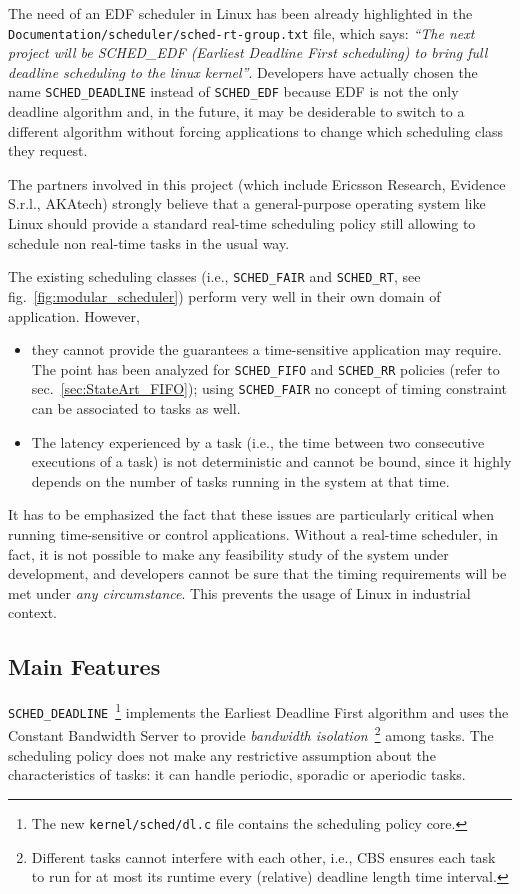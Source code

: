 The need of an EDF scheduler in Linux has been already highlighted in
the \texttt{Documentation/scheduler/sched-rt-group.txt} file, which
says: \emph{``The next project will be SCHED\_EDF (Earliest Deadline
  First scheduling) to bring full deadline scheduling to the linux
  kernel''}. Developers have actually chosen the name
\texttt{SCHED\_DEADLINE} instead of \texttt{SCHED\_EDF} because EDF is
not the only deadline algorithm and, in the future, it may be
desiderable to switch to a different algorithm without forcing
applications to change which scheduling class they request.

The partners involved in this project (which include Ericsson
Research, Evidence S.r.l., AKAtech) strongly believe that a
general-purpose operating system like Linux should provide a standard
real-time scheduling policy still allowing to schedule non real-time
tasks in the usual way.

The existing scheduling classes (i.e., \texttt{SCHED\_FAIR} and
\texttt{SCHED\_RT}, see fig.~\ref{fig:modular_scheduler}) perform very well in
their own domain of application. However,
\begin{itemize}
\item they cannot provide the guarantees a time-sensitive application
  may require. The point has been analyzed for \texttt{SCHED\_FIFO}
  and \texttt{SCHED\_RR} policies (refer to
  sec.~\ref{sec:StateArt_FIFO}); using \texttt{SCHED\_FAIR} no concept
  of timing constraint can be associated to tasks as well.
\item The latency experienced by a task (i.e., the time between two
  consecutive executions of a task) is not deterministic and cannot be
  bound, since it highly depends on the number of tasks running in the
  system at that time.
\end{itemize}
It has to be emphasized the fact that these issues are particularly
critical when running time-sensitive or control applications. Without
a real-time scheduler, in fact, it is not possible to make any
feasibility study of the system under development, and developers
cannot be sure that the timing requirements will be met under
\emph{any circumstance}. This prevents the usage of Linux in
industrial context.

\subsection{Main Features}\label{sec:schedDead_main}

\texttt{SCHED\_DEADLINE}~\footnote{The new \texttt{kernel/sched/dl.c}
  file contains the scheduling policy core.} implements the Earliest
Deadline First algorithm and uses the Constant Bandwidth Server to
provide \emph{bandwidth isolation}~\footnote{Different tasks cannot
  interfere with each other, i.e., CBS ensures each task to run for at
  most its runtime every (relative) deadline length time interval.}
among tasks. The scheduling policy does not make any restrictive
assumption about the characteristics of tasks: it can handle periodic,
sporadic or aperiodic tasks.

